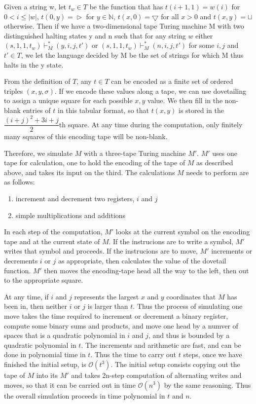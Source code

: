 \documentclass[12pt]{article}
\begin{document}
Given a string w, let $t_w\in T$ be the function that has $t(i+1, 1) = w(i)$ for $0 < i \leq |w|$, $t(0, y) = \vartriangleright$ for $y\in \mathbb{N} $, $t(x, 0) = \bigtriangledown$ for all $x > 0$ and $t(x, y) = \sqcup$ otherwise. Then if we have a two-dimensional tape Turing machine M with two distinguished halting states y and n such that for any string $w$ either $(s, 1, 1, t_w) \vdash^*_M (y, i, j, t')$ or $(s, 1, 1, t_w) \vdash^*_M (n, i, j, t')$ for some $i, j$ and $t'\in T$, we let the language decided by M be the set of strings for which M thus halts in the y state.

From the definition of $T$, any $t \in T$ can be encoded as a finite set of ordered triples $(x, y, \sigma)$. If we encode these values along a tape, we can use dovetailing to assign a unique square for each possible $x, y$ value. We then fill in the non-blank entries of $t$ in this tabular format, so that $t(x, y)$ is stored in the $\dfrac{(i+j)^2+3i+j}{2}$th square. At any time during the computation, only finitely many squares of this encoding tape will be non-blank.

Therefore, we simulate $M$ with a three-tape Turing machine $M'$. $M'$ uses one tape for calculation, one to hold the encoding of the tape of $M$ as described above, and takes its input on the third. The calculations $M$ needs to perform are as follows:
\begin{enumerate}
    \item increment and decrement two registers, $i$ and $j$
    \item simple multiplications and additions
\end{enumerate}

In each step of the computation, $M'$ looks at the current symbol on the encoding tape and at the current state of $M$. If the instrucions are to write a symbol, $M'$ writes that symbol and proceeds. If the instrucions are to move, $M'$ increments or decrements $i$ or $j$ as appropriate, then calculates the value of the dovetail function. $M'$ then moves the encoding-tape head all the way to the left, then out to the appropriate square.

At any time, if $i$ and $j$ represents the largest $x$ and $y$ coordinates that $M$ has been in, then neither $i$ or $j$ is larger than $t$. Thus the process of simulating one move takes the time required to increment or decrement a binary register, compute some binary sums and products, and move one head by a numver of spaces that is a quadratic polynomial in $i$ and $j$, and thus is bounded by a quadratic polynomial in $t$. The increments and arithmetic are fast, and can be done in polynomial time in $t$. Thus the time to carry out $t$ steps, once we have finished the initial setup, is $\mathcal{O}(t^3)$. The initial setup consists copying out the tape of $M$ into its $M'$ and takes 2n-step computation of alternating writes and moves, so that it can be carried out in time $\mathcal{O}(n^3)$ by the same reasoning. Thus the overall simulation proceeds in time polynomial in $t$ and $n$.
\end{document}
